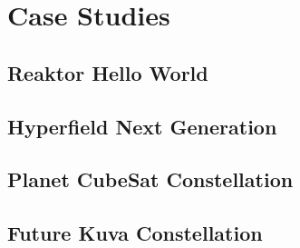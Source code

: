 \chapter{Case Studies} \label{case_studies_chapter}

\section{Reaktor Hello World}

\section{Hyperfield Next Generation}

\section{Planet CubeSat Constellation}

\section{Future Kuva Constellation}